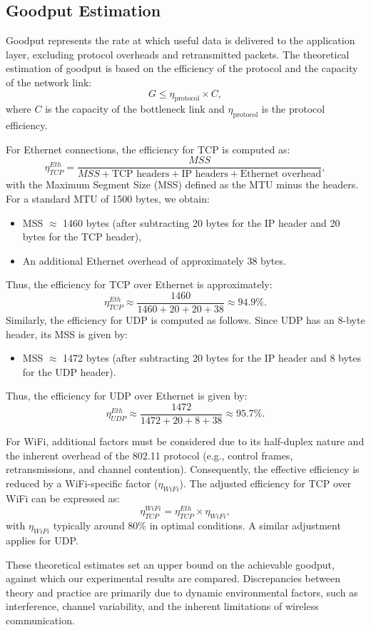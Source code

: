 \subsection{Goodput Estimation} \label{subsec:goodput-estimation}

Goodput represents the rate at which useful data is delivered to the application layer, excluding protocol overheads and retransmitted packets. The theoretical estimation of goodput is based on the efficiency of the protocol and the capacity of the network link:
\[
G \leq \eta_{\text{protocol}} \times C,
\]
where \(C\) is the capacity of the bottleneck link and \(\eta_{\text{protocol}}\) is the protocol efficiency.

For Ethernet connections, the efficiency for TCP is computed as:
\[
\eta_{TCP}^{Eth} = \frac{MSS}{MSS + \text{TCP headers} + \text{IP headers} + \text{Ethernet overhead}},
\]
with the Maximum Segment Size (MSS) defined as the MTU minus the headers. For a standard MTU of 1500 bytes, we obtain:
\begin{itemize}
    \item MSS \(\approx\) 1460 bytes (after subtracting 20 bytes for the IP header and 20 bytes for the TCP header),
    \item An additional Ethernet overhead of approximately 38 bytes.
\end{itemize}
Thus, the efficiency for TCP over Ethernet is approximately:
\[
\eta_{TCP}^{Eth} \approx \frac{1460}{1460 + 20 + 20 + 38} \approx 94.9\%.
\]
Similarly, the efficiency for UDP is computed as follows. Since UDP has an 8-byte header, its MSS is given by:
\begin{itemize}
    \item MSS \(\approx\) 1472 bytes (after subtracting 20 bytes for the IP header and 8 bytes for the UDP header).
\end{itemize}
Thus, the efficiency for UDP over Ethernet is given by:
\[
\eta_{UDP}^{Eth} \approx \frac{1472}{1472 + 20 + 8 + 38} \approx 95.7\%.
\]


For WiFi, additional factors must be considered due to its half-duplex nature and the inherent overhead of the 802.11 protocol (e.g., control frames, retransmissions, and channel contention). Consequently, the effective efficiency is reduced by a WiFi-specific factor (\(\eta_{WiFi}\)). The adjusted efficiency for TCP over WiFi can be expressed as:
\[
\eta_{TCP}^{WiFi} = \eta_{TCP}^{Eth} \times \eta_{WiFi},
\]
with \(\eta_{WiFi}\) typically around 80\% in optimal conditions. A similar adjustment applies for UDP.

These theoretical estimates set an upper bound on the achievable goodput, against which our experimental results are compared. Discrepancies between theory and practice are primarily due to dynamic environmental factors, such as interference, channel variability, and the inherent limitations of wireless communication.
